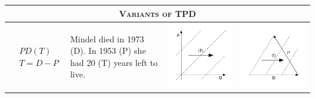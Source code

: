 \documentclass[11pt,oneside,a4paper]{article} %
\begin{document}
\begin{center}
\begin{longtable}{m{}m{}m{}m{}}
  \midrule
  \multicolumn{4}{c}{\textsc{Variants of TPD}} \\
  \midrule
  $$\begin{aligned}
    &PD(T) \\
    &T = D - P
  \end{aligned}$$ &
  Mindel died in 1973 (D). In 1953 (P) she had 20 (T) years left to live. &
  \includegraphics[width = \linewidth]{Figures/JonasTable/PDt.pdf} &
  \includegraphics[width = \linewidth]{Figures/JonasTable/PDt_iso.pdf}  \\

\end{longtable}
\end{center}
\end{document}

